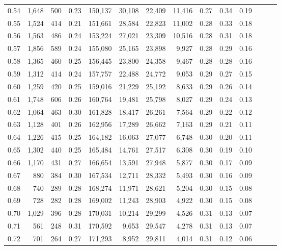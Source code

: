 \begin{tabular}{rrrrrrrrrrrrrr}
0.54 &  1,648 &  500 &  0.23 &  150,137 &   30,108 &  22,409 &  11,416 &  0.27 &  0.34 &      0.19 \\
0.55 &  1,524 &  414 &  0.21 &  151,661 &   28,584 &  22,823 &  11,002 &  0.28 &  0.33 &      0.18 \\
0.56 &  1,563 &  486 &  0.24 &  153,224 &   27,021 &  23,309 &  10,516 &  0.28 &  0.31 &      0.18 \\
0.57 &  1,856 &  589 &  0.24 &  155,080 &   25,165 &  23,898 &   9,927 &  0.28 &  0.29 &      0.16 \\
0.58 &  1,365 &  460 &  0.25 &  156,445 &   23,800 &  24,358 &   9,467 &  0.28 &  0.28 &      0.16 \\
0.59 &  1,312 &  414 &  0.24 &  157,757 &   22,488 &  24,772 &   9,053 &  0.29 &  0.27 &      0.15 \\
0.60 &  1,259 &  420 &  0.25 &  159,016 &   21,229 &  25,192 &   8,633 &  0.29 &  0.26 &      0.14 \\
0.61 &  1,748 &  606 &  0.26 &  160,764 &   19,481 &  25,798 &   8,027 &  0.29 &  0.24 &      0.13 \\
0.62 &  1,064 &  463 &  0.30 &  161,828 &   18,417 &  26,261 &   7,564 &  0.29 &  0.22 &      0.12 \\
0.63 &  1,128 &  401 &  0.26 &  162,956 &   17,289 &  26,662 &   7,163 &  0.29 &  0.21 &      0.11 \\
0.64 &  1,226 &  415 &  0.25 &  164,182 &   16,063 &  27,077 &   6,748 &  0.30 &  0.20 &      0.11 \\
0.65 &  1,302 &  440 &  0.25 &  165,484 &   14,761 &  27,517 &   6,308 &  0.30 &  0.19 &      0.10 \\
0.66 &  1,170 &  431 &  0.27 &  166,654 &   13,591 &  27,948 &   5,877 &  0.30 &  0.17 &      0.09 \\
0.67 &    880 &  384 &  0.30 &  167,534 &   12,711 &  28,332 &   5,493 &  0.30 &  0.16 &      0.09 \\
0.68 &    740 &  289 &  0.28 &  168,274 &   11,971 &  28,621 &   5,204 &  0.30 &  0.15 &      0.08 \\
0.69 &    728 &  282 &  0.28 &  169,002 &   11,243 &  28,903 &   4,922 &  0.30 &  0.15 &      0.08 \\
0.70 &  1,029 &  396 &  0.28 &  170,031 &   10,214 &  29,299 &   4,526 &  0.31 &  0.13 &      0.07 \\
0.71 &    561 &  248 &  0.31 &  170,592 &    9,653 &  29,547 &   4,278 &  0.31 &  0.13 &      0.07 \\
0.72 &    701 &  264 &  0.27 &  171,293 &    8,952 &  29,811 &   4,014 &  0.31 &  0.12 &      0.06 \\

\end{tabular}
